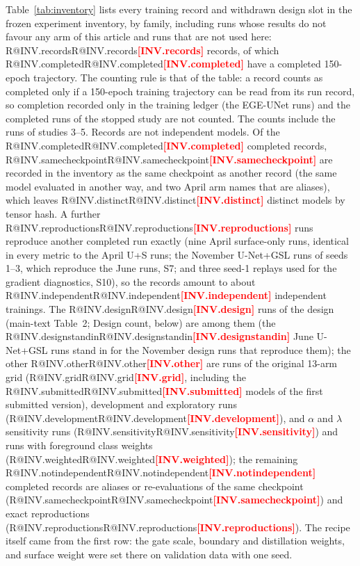\documentclass[10pt]{article}
\makeatletter
\newcommand{\R}[1]{\ifcsname R@#1\endcsname\csname R@#1\endcsname\else\textbf{\textcolor{red}{[#1]}}\fi}
\renewcommand\paragraph{\@startsection{paragraph}{4}{\z@}{1.6ex \@plus .5ex \@minus .2ex}{-1em}{\normalfont\normalsize\bfseries}}
\makeatother
\begin{document}
\paragraph{Record.} Table~\ref{tab:inventory} lists every training record and withdrawn design slot in the frozen experiment inventory, by family, including runs whose results do not favour any arm of this article and runs that are not used here: \R{INV.records} records, of which \R{INV.completed} have a completed 150-epoch trajectory. The counting rule is that of the table: a record counts as completed only if a 150-epoch training trajectory can be read from its run record, so completion recorded only in the training ledger (the EGE-UNet runs) and the completed runs of the stopped study are not counted. The counts include the runs of studies 3--5. Records are not independent models. Of the \R{INV.completed} completed records, \R{INV.samecheckpoint} are recorded in the inventory as the same checkpoint as another record (the same model evaluated in another way, and two April arm names that are aliases), which leaves \R{INV.distinct} distinct models by tensor hash. A further \R{INV.reproductions} runs reproduce another completed run exactly (nine April surface-only runs, identical in every metric to the April U+S runs; the November U-Net+GSL runs of seeds 1--3, which reproduce the June runs, S7; and three seed-1 replays used for the gradient diagnostics, S10), so the records amount to about \R{INV.independent} independent trainings. The \R{INV.design} runs of the design (main-text Table~2; Design count, below) are among them (the \R{INV.designstandin} June U-Net+GSL runs stand in for the November design runs that reproduce them); the other \R{INV.other} are runs of the original 13-arm grid (\R{INV.grid}, including the \R{INV.submitted} models of the first submitted version), development and exploratory runs (\R{INV.development}), and $\alpha$ and $\lambda$ sensitivity runs (\R{INV.sensitivity}) and runs with foreground class weights (\R{INV.weighted}); the remaining \R{INV.notindependent} completed records are aliases or re-evaluations of the same checkpoint (\R{INV.samecheckpoint}) and exact reproductions (\R{INV.reproductions}). The recipe itself came from the first row: the gate scale, boundary and distillation weights, and surface weight were set there on validation data with one seed.
{\scriptsize\setlength{\tabcolsep}{3pt}
}
\end{document}
